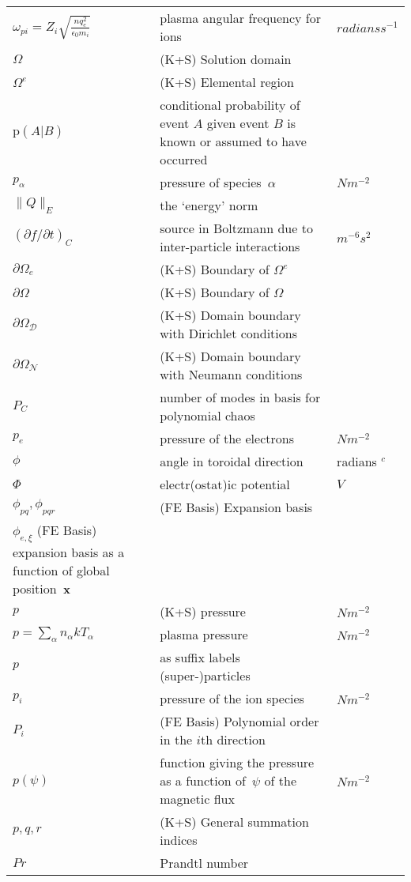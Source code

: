 \begin{longtable}{|p{3.0cm}|p{10.0cm}|p{3.0cm}|}
$\omega_{pi}= Z_i\sqrt{\frac{nq_e^2}{\epsilon_0 m_i}}$ & plasma angular frequency for ions & $radians s^{-1}$ \\
$\Omega$ &  (K+S) Solution domain & \\
$\Omega^e$ &  (K+S) Elemental region & \\
$\mathrm{p}(A|B)$ & conditional probability of event $A$ given event $B$ is known or assumed to have occurred  & \\
$p_\alpha$ & pressure of species~$\alpha$  & $N m^{-2}$ \\
$\parallel  Q \parallel_E $ &the `energy' norm  & \\
$(\partial f/\partial t)_C$ & source in Boltzmann due to inter-particle interactions  & $m^{-6} s^2$ \\
$\partial \Omega_e$ &  (K+S) Boundary of $\Omega^e$ & \\
$\partial \Omega$ &  (K+S) Boundary of $\Omega$ & \\
$\partial \Omega_{\mathcal D}$ &  (K+S) Domain boundary with Dirichlet conditions & \\
$\partial \Omega_{\mathcal N}$ &  (K+S) Domain boundary with Neumann conditions & \\
$P_C$ & number of modes in basis for polynomial chaos & \\
$p_e$ & pressure of the electrons  & $N m^{-2}$ \\
$\phi$ & angle in toroidal direction & radians $^c$ \\
$\Phi$ & electr(ostat)ic potential  & $V$ \\
$\phi_{pq}, \phi_{pqr}$ &  (FE Basis) Expansion basis & \\
$\phi_{e,\xi}$ (FE Basis) expansion basis as a function of global position~${\bf x}$ & \\
$p$ & (K+S) pressure  & $N m^{-2}$ \\
$p = \sum_\alpha n_\alpha kT_\alpha$ & plasma pressure  & $N m^{-2}$ \\
$p$ & as suffix labels (super-)particles & \\
$p_i$ & pressure of the ion species  & $N m^{-2}$ \\
$P_i$ &  (FE Basis) Polynomial order in the $i$th direction & \\
$p(\psi)$ & function giving the pressure as a function of~$\psi$ of the magnetic flux  & $N m^{-2}$ \\
$p,q,r$ &  (K+S) General summation indices & \\
$Pr$ & Prandtl number & \\

\end{longtable}

